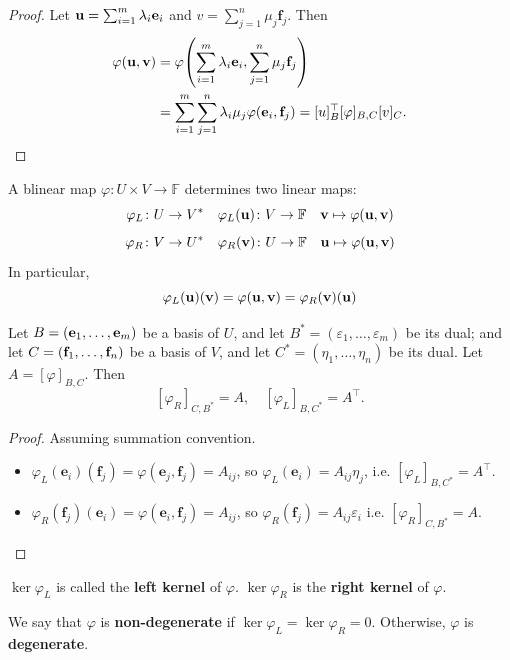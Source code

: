 \documentclass[a4paper]{article}
\renewcommand{\epsilon}{\varepsilon}
\begin{document}
\begin{proof}
	Let $ {\bf u} = \sum_{i=1}^m \lambda_i {\bf e}_i $ and $ v = \sum_{j=1}^n \mu_j \mathbf{f}_j $.
	Then
	\begin{align*}
        \varphi({\bf u},{\bf v}) &= \varphi\qty( \sum_{i=1}^m \lambda_i \mathbf{e}_i, \sum_{j=1}^n \mu_j \mathbf{f}_j ) \\ 
        &= \sum_{i=1}^m \sum_{j=1}^n \lambda_i \mu_j \varphi(\mathbf{e}_i,\mathbf{f}_j) = [u]_B^\top [\varphi]_{B,C} [v]_C. \qedhere
    \end{align*}
\end{proof}

\begin{definition}
	A blinear map $ \varphi: U\times V \to \mathbb{F} $ determines two linear maps: 
	\[
		\varphi_L \colon U \to V^* \quad \varphi_L({\bf u}) \colon V \to {\mathbb{F}} \quad {\bf v} \mapsto \varphi({\bf u},{\bf v})
	\]
	\[
		\varphi_R \colon V \to U^* \quad \varphi_R({\bf v}) \colon U \to {\mathbb{F}} \quad {\bf u} \mapsto \varphi({\bf u},{\bf v})
	\]
	In particular,
	\[
		\varphi_L({\bf u})({\bf v}) = \varphi({\bf u},{\bf v}) = \varphi_R({\bf v})({\bf u})
	\]
\end{definition}

\begin{lemma}
	Let $ B = ({\bf e}_1, \dots, {\bf e}_m) $ be a basis of $ U $, and let $ B^* = (\varepsilon_1, \dots, \varepsilon_m) $ be its dual; and let $ C = ({\bf f}_1, \dots, {\bf f}_n) $ be a basis of $ V $, and let $ C^* = (\eta_1, \dots, \eta_n) $ be its dual.
	Let $ A = [\varphi]_{B,C} $.
	Then
	\[
		[\varphi_R]_{C, B^*} = A,\quad [\varphi_L]_{B, C^*} = A^\top.
	\]
\end{lemma}
\begin{proof}
    Assuming summation convention.
    \begin{itemize}
        \item $ \varphi_L(\mathbf{e}_i)(\mathbf{f}_j) = \varphi(\mathbf{e}_j,\mathbf{f}_j) = A_{ij} $, so $ \varphi_L(\mathbf{e}_i) = A_{ij}\eta_j $, i.e. $  [\varphi_L]_{B, C^*} = A^\top $. 
        \item $ \varphi_R(\mathbf{f}_j)(\mathbf{e}_i) = \varphi(\mathbf{e}_i,\mathbf{f}_j) = A_{ij} $, so $ \varphi_R(\mathbf{f}_j) = A_{ij}\epsilon_i $ i.e. $ [\varphi_R]_{C, B^*} = A $. \qedhere
    \end{itemize}
\end{proof}
\begin{definition}
	$ \ker \varphi_L $ is called the \textbf{left kernel} of $ \varphi $.
	$ \ker \varphi_R $ is the \textbf{right kernel} of $ \varphi $.
\end{definition}
\begin{definition}
	We say that $ \varphi $ is \textbf{non-degenerate} if $ \ker \varphi_L = \ker \varphi_R = \qty{0} $.
	Otherwise, $ \varphi $ is \textbf{degenerate}.
\end{definition}
\end{document}
